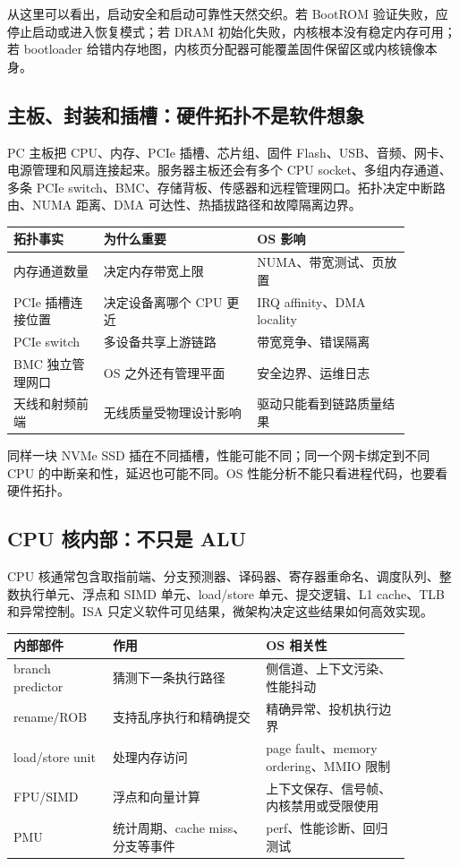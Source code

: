 从这里可以看出，启动安全和启动可靠性天然交织。若 BootROM 验证失败，应停止启动或进入恢复模式；若 DRAM 初始化失败，内核根本没有稳定内存可用；若 bootloader 给错内存地图，内核页分配器可能覆盖固件保留区或内核镜像本身。

\subsection{主板、封装和插槽：硬件拓扑不是软件想象}

PC 主板把 CPU、内存、PCIe 插槽、芯片组、固件 Flash、USB、音频、网卡、电源管理和风扇连接起来。服务器主板还会有多个 CPU socket、多组内存通道、多条 PCIe switch、BMC、存储背板、传感器和远程管理网口。拓扑决定中断路由、NUMA 距离、DMA 可达性、热插拔路径和故障隔离边界。

\begin{longtable}{p{0.2\linewidth}p{0.34\linewidth}p{0.34\linewidth}}
\toprule
拓扑事实 & 为什么重要 & OS 影响 \\
\midrule
内存通道数量 & 决定内存带宽上限 & NUMA、带宽测试、页放置 \\
PCIe 插槽连接位置 & 决定设备离哪个 CPU 更近 & IRQ affinity、DMA locality \\
PCIe switch & 多设备共享上游链路 & 带宽竞争、错误隔离 \\
BMC 独立管理网口 & OS 之外还有管理平面 & 安全边界、运维日志 \\
天线和射频前端 & 无线质量受物理设计影响 & 驱动只能看到链路质量结果 \\
\bottomrule
\end{longtable}

同样一块 NVMe SSD 插在不同插槽，性能可能不同；同一个网卡绑定到不同 CPU 的中断亲和性，延迟也可能不同。OS 性能分析不能只看进程代码，也要看硬件拓扑。

\subsection{CPU 核内部：不只是 ALU}

CPU 核通常包含取指前端、分支预测器、译码器、寄存器重命名、调度队列、整数执行单元、浮点和 SIMD 单元、load/store 单元、提交逻辑、L1 cache、TLB 和异常控制。ISA 只定义软件可见结果，微架构决定这些结果如何高效实现。

\begin{longtable}{p{0.22\linewidth}p{0.34\linewidth}p{0.32\linewidth}}
\toprule
内部部件 & 作用 & OS 相关性 \\
\midrule
branch predictor & 猜测下一条执行路径 & 侧信道、上下文污染、性能抖动 \\
rename/ROB & 支持乱序执行和精确提交 & 精确异常、投机执行边界 \\
load/store unit & 处理内存访问 & page fault、memory ordering、MMIO 限制 \\
FPU/SIMD & 浮点和向量计算 & 上下文保存、信号帧、内核禁用或受限使用 \\
PMU & 统计周期、cache miss、分支等事件 & perf、性能诊断、回归测试 \\
\bottomrule
\end{longtable}

